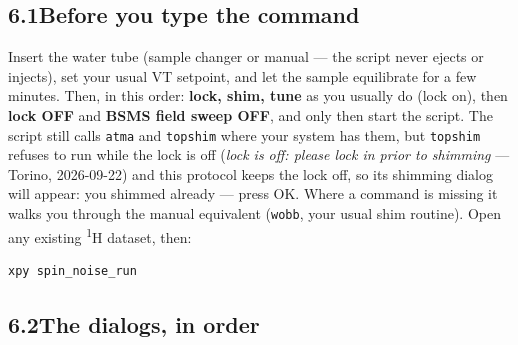 \documentclass[11pt]{article}
\newcommand{\hnmr}{\textsuperscript{1}H}
\begin{document}
\subsection*{6.1\quad Before you type the command}

Insert the water tube (sample changer or manual --- the script never ejects
or injects), set your usual VT setpoint, and let the sample equilibrate for a
few minutes. Then, in this order: \textbf{lock, shim, tune} as you usually
do (lock on), then \textbf{lock OFF} and \textbf{BSMS field sweep OFF}, and
only then start the script. The script still calls \texttt{atma} and
\texttt{topshim} where your system has them, but \texttt{topshim} refuses to
run while the lock is off (\emph{lock is off: please lock in prior to
shimming} --- Torino, 2026-09-22) and this protocol keeps the lock off, so
its shimming dialog will appear: you shimmed already --- press OK. Where a
command is missing it walks you through the manual equivalent
(\texttt{wobb}, your usual shim routine). Open any existing \hnmr{} dataset,
then:
\begin{lstlisting}
xpy spin_noise_run
\end{lstlisting}

\subsection*{6.2\quad The dialogs, in order}
\end{document}
